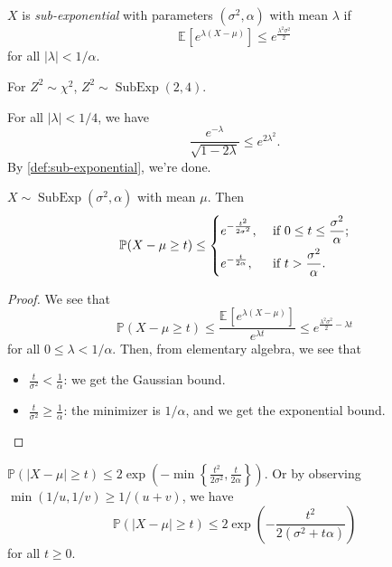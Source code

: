 \begin{definition}\label{def:sub-exponential}
	\(X\) is \emph{sub-exponential} with parameters \((\sigma ^{2} , \alpha )\) with mean \(\lambda \) if
	\[
		\mathbb{E}_{}\left[e^{\lambda (X - \mu )} \right] \leq e^{\frac{\lambda ^{2} \sigma ^{2} }{2}}
	\]
	for all \(\vert \lambda  \vert < 1 / \alpha \).
\end{definition}

\begin{eg}
	For \(Z^2 \sim \chi ^{2} \), \(Z^2 \sim \mathop{\mathrm{SubExp}}(2, 4) \).
\end{eg}
\begin{explanation}
	For all \(\vert \lambda \vert < 1 / 4\), we have
	\[
		\frac{e^{-\lambda }}{\sqrt{1 - 2 \lambda } } \leq e^{2 \lambda ^{2} }.
	\]
	By \autoref{def:sub-exponential}, we're done.
\end{explanation}

\begin{lemma}
	\(X \sim \mathop{\mathrm{SubExp}}(\sigma ^{2} , \alpha ) \) with mean \(\mu \). Then
	\[
		\mathbb{P} (X - \mu \geq t) \leq
		\begin{dcases}
			e^{- \frac{t^2}{2 \sigma ^{2} }}, & \text{ if } 0 \leq t \leq \frac{\sigma ^{2}}{\alpha } ; \\
			e^{- \frac{t}{2\alpha }},         & \text{ if } t > \frac{\sigma ^{2} }{\alpha }.
		\end{dcases}
	\]
\end{lemma}
\begin{proof}
	We see that
	\[
		\mathbb{P} (X- \mu \geq t)
		\leq \frac{\mathbb{E}_{}\left[e^{\lambda (X - \mu )} \right] }{e^{\lambda t}}
		\leq e^{\frac{\lambda ^{2} \sigma ^{2} }{2} - \lambda t}
	\]
	for all \(0 \leq \lambda < 1 / \alpha \). Then, from elementary algebra, we see that
	\begin{itemize}
		\item \(\frac{t}{\sigma ^{2} } < \frac{1}{\alpha }\): we get the Gaussian bound.
		\item \(\frac{t}{\sigma ^{2} } \geq \frac{1}{\alpha }\): the minimizer is \(1 / \alpha \), and we get the exponential bound.
	\end{itemize}
\end{proof}

\begin{remark}
	\(\mathbb{P} (\vert X - \mu  \vert \geq t) \leq 2 \exp \left( - \min \left\{ \frac{t^2}{2 \sigma ^{2} }, \frac{t}{2\alpha } \right\}  \right) \). Or by observing \(\min (1 / u, 1 / v ) \geq 1 / (u + v)\), we have
	\[
		\mathbb{P} (\vert X - \mu  \vert \geq t) \leq 2 \exp \left( - \frac{t^2}{2(\sigma ^{2} + t \alpha )} \right)
	\]
	for all \(t \geq 0\).
\end{remark}

